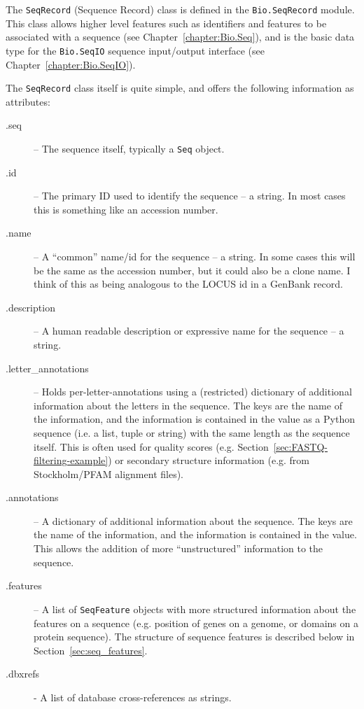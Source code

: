 \documentclass{report}
\begin{document}
The \verb|SeqRecord| (Sequence Record) class is defined in the \verb|Bio.SeqRecord| module. This class allows higher level features such as identifiers and features to be associated with a sequence (see Chapter~\ref{chapter:Bio.Seq}), and is the basic data type for the \verb|Bio.SeqIO| sequence input/output interface (see Chapter~\ref{chapter:Bio.SeqIO}).

The \verb|SeqRecord| class itself is quite simple, and offers the following information as attributes:

\begin{description}
  \item[.seq] -- The sequence itself, typically a \verb|Seq| object.

  \item[.id] -- The primary ID used to identify the sequence -- a string. In most cases this is something like an accession number.

  \item[.name] -- A ``common'' name/id for the sequence -- a string. In some cases this will be the same as the accession number, but it could also be a clone name. I think of this as being analogous to the LOCUS id in a GenBank record.

  \item[.description] -- A human readable description or expressive name for the sequence -- a string.
  
  \item[.letter\_annotations] -- Holds per-letter-annotations using a (restricted) dictionary of additional information about the letters in the sequence. The keys are the name of the information, and the information is contained in the value as a Python sequence (i.e. a list, tuple or string) with the same length as the sequence itself.  This is often used for quality scores (e.g. Section~\ref{sec:FASTQ-filtering-example}) or secondary structure information (e.g. from Stockholm/PFAM alignment files).

  \item[.annotations] -- A dictionary of additional information about the sequence. The keys are the name of the information, and the information is contained in the value. This allows the addition of more ``unstructured'' information to the sequence.
  
  \item[.features] -- A list of \verb|SeqFeature| objects with more structured information about the features on a sequence (e.g. position of genes on a genome, or domains on a protein sequence). The structure of sequence features is described below in Section~\ref{sec:seq_features}.
  
  \item[.dbxrefs] - A list of database cross-references as strings.
\end{description}
\end{document}
